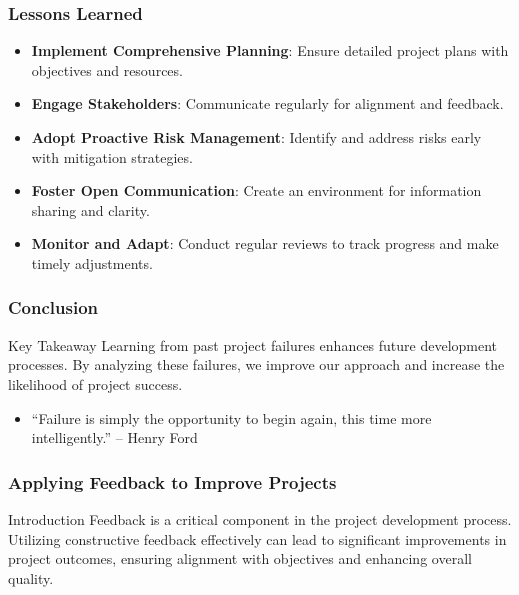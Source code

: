 \documentclass[aspectratio=169]{beamer}
\begin{document}
\begin{frame}[fragile]
    \frametitle{Lessons Learned}
    \begin{itemize}
        \item \textbf{Implement Comprehensive Planning}: Ensure detailed project plans with objectives and resources.
        \item \textbf{Engage Stakeholders}: Communicate regularly for alignment and feedback.
        \item \textbf{Adopt Proactive Risk Management}: Identify and address risks early with mitigation strategies.
        \item \textbf{Foster Open Communication}: Create an environment for information sharing and clarity.
        \item \textbf{Monitor and Adapt}: Conduct regular reviews to track progress and make timely adjustments.
    \end{itemize}
\end{frame}

\begin{frame}[fragile]
    \frametitle{Conclusion}
    \begin{block}{Key Takeaway}
        Learning from past project failures enhances future development processes. By analyzing these failures, we improve our approach and increase the likelihood of project success.
    \end{block}
    \begin{itemize}
        \item ``Failure is simply the opportunity to begin again, this time more intelligently.'' – Henry Ford
    \end{itemize}
\end{frame}

\begin{frame}[fragile]
    \frametitle{Applying Feedback to Improve Projects}
    \begin{block}{Introduction}
        Feedback is a critical component in the project development process. Utilizing constructive feedback effectively can lead to significant improvements in project outcomes, ensuring alignment with objectives and enhancing overall quality.
    \end{block}
\end{frame}
\end{document}
